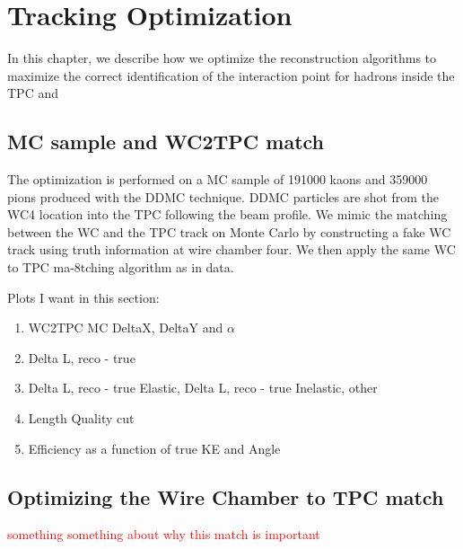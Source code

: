 \chapter{Tracking Optimization}
In this chapter, we describe how we optimize the reconstruction algorithms to maximize the correct identification of the interaction point for hadrons inside the TPC and 


\section{MC sample and WC2TPC match}
The optimization is performed on a MC sample of 191000 kaons and 359000 pions produced with the DDMC technique. DDMC particles are shot from the WC4 location into the TPC following the beam profile.
We mimic the matching between the WC and the TPC track on Monte Carlo by constructing a fake WC track using truth information at wire chamber four. We then apply the same WC to TPC ma-8tching algorithm as in data. 

Plots I want in this section:
\begin{enumerate}
\item WC2TPC MC DeltaX, DeltaY and $\alpha$
\item Delta L, reco - true
\item Delta L, reco - true Elastic, Delta L, reco - true Inelastic, other
\item Length Quality cut
\item Efficiency as a function of true KE and Angle
\end{enumerate}





\section{Optimizing the Wire Chamber to TPC match}\label{ch:WC2TPCMatchOptimization}
\textcolor{red}{something something about why this match is important}


